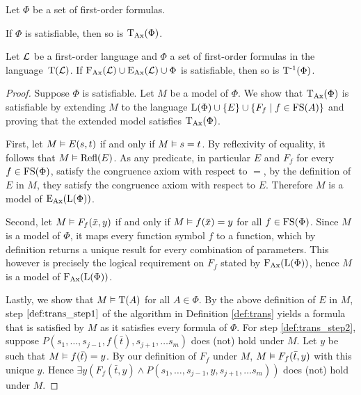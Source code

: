\begin{prop}
	\label{prop:transSatEquiv}
	Let $\Phi$ be a set of first-order formulas.
	\begin{compactenum}
	\item If $\Phi$ is satisfiable, then so is $\operatorname{\operatorname{T}_{Ax}}(\Phi)$.
			\label{prop:transSatEquiv1}
		\item Let $\operatorname{\mathcal{L}}$ be a first-order language and $\Phi$ a set of first-order formulas in the language~$\operatorname{T}(\operatorname{\mathcal{L}})$.
			If $\operatorname{F_{Ax}}(\operatorname{\mathcal{L}}) \cup \operatorname{E_{Ax}}(\operatorname{\mathcal{L}}) \cup \Phi $ is satisfiable, then so is $\operatorname{T^{-1}}(\Phi)$.
			\label{prop:transSatEquiv2}
	\end{compactenum}
\end{prop}
\begin{proof}
	Suppose $\Phi$ is satisfiable.
	Let $M$ be a model of $\Phi$.
	We show that $\operatorname{\operatorname{T}_{Ax}}(\Phi)$ is satisfiable by extending $M$ to the language $\operatorname{L}(\Phi)\cup\{E\}\cup\{F_f\mid f \in \operatorname{FS}(A)\}$ and proving that the extended model satisfies $\operatorname{\operatorname{T}_{Ax}}(\Phi)$.

	First, let $M \vDash E(s, t)$ if and only if $M \vDash s = t$.
	By reflexivity of equality, it follows that $M \vDash \operatorname{Refl}(E)$.
	As any predicate, in particular $E$ and $F_f$ for every $f \in \operatorname{FS}(\Phi)$, satisfy the congruence axiom with respect to $=$, by the definition of $E$ in $M$, they satisfy the congruence axiom with respect to $E$.
	Therefore $M$ is a model of $\operatorname{E_{Ax}}(\operatorname{L}(\Phi))$.

	Second, let $M \vDash F_f(\bar x, y)$ if and only if $M \vDash f(\bar x) = y$ for all $f \in \operatorname{FS}(\Phi)$. 
	Since $M$ is a model of $\Phi$, it maps every function symbol $f$ to a function, which by definition returns a unique result for every combination of parameters.
	This however is precisely the logical requirement on $F_f$ stated by $\operatorname{F_{Ax}}(\operatorname{L}(\Phi))$,   
	hence $M$ is a model of $\operatorname{F_{Ax}}(\operatorname{L}(\Phi))$.

	Lastly, we show that $M \vDash \operatorname{T}(A)$ for all $A \in \Phi$.
	By the above definition of $E$ in $M$, step $\ref{def:trans_step1}$ of the algorithm in Definition \ref{def:trans} yields a formula that is satisfied by $M$ as it satisfies every formula of $\Phi$.
	For step \ref{def:trans_step2}, suppose $P(s_1, \ldots, s_{j-1}, f(\bar t),\allowbreak s_{j+1}, \ldots s_m)$ does (not) hold under $M$.
	Let $y$ be such that $M \vDash f(\bar t)=y$.
	By our definition of $F_f$ under $M$, $M\vDash F_f(\bar t, y)$ with this unique $y$.
	Hence $\exists y (F_f(\bar t, y) \land P(s_1, \ldots, s_{j-1}, y, \allowbreak s_{j+1}, \ldots s_m))$ does (not) hold under $M$.



\end{proof}

